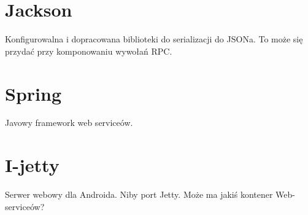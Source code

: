 \section{Jackson}
Konfigurowalna i dopracowana biblioteki do serializacji do JSONa. To może się przydać przy komponowaniu wywołań RPC.

%


\section{Spring}
Javowy framework web serviceów.


\section{I-jetty}
Serwer webowy dla Androida. Niby port Jetty. Może ma jakiś kontener Web-serviceów?

